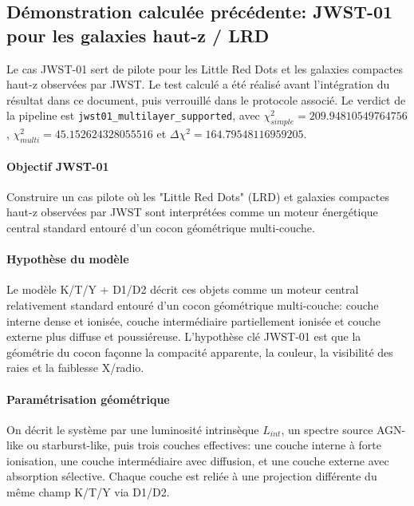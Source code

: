 \documentclass[11pt,a4paper]{article}
\begin{document}
\subsection{Démonstration calculée précédente: JWST-01 pour les galaxies haut-z / LRD}
Le cas JWST-01 sert de pilote pour les Little Red Dots et les galaxies compactes haut-z observées par JWST. Le test calculé a été réalisé avant l'intégration du résultat dans ce document, puis verrouillé dans le protocole associé. Le verdict de la pipeline est \texttt{jwst01\_multilayer\_supported}, avec $\chi^2_{simple}=209.94810549764756$, $\chi^2_{multi}=45.152624328055516$ et $\Delta\chi^2=164.79548116959205$.

\paragraph{Objectif JWST-01}
Construire un cas pilote où les "Little Red Dots" (LRD) et galaxies compactes haut-z observées par JWST sont interprétées comme un moteur énergétique central standard entouré d'un cocon géométrique multi-couche.

\paragraph{Hypothèse du modèle}
Le modèle K/T/Y + D1/D2 décrit ces objets comme un moteur central relativement standard entouré d'un cocon géométrique multi-couche: couche interne dense et ionisée, couche intermédiaire partiellement ionisée et couche externe plus diffuse et poussiéreuse. L'hypothèse clé JWST-01 est que la géométrie du cocon façonne la compacité apparente, la couleur, la visibilité des raies et la faiblesse X/radio.

\paragraph{Paramétrisation géométrique}
On décrit le système par une luminosité intrinsèque $L_{int}$, un spectre source AGN-like ou starburst-like, puis trois couches effectives: une couche interne à forte ionisation, une couche intermédiaire avec diffusion, et une couche externe avec absorption sélective. Chaque couche est reliée à une projection différente du même champ K/T/Y via D1/D2.
\end{document}
